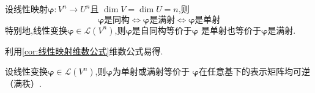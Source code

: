 \begin{green}
\begin{corollary}[同维的统一]\label{coro:同维的统一}
    设线性映射$\bm{\varphi}:V^n\longrightarrow U^n$且
    $\dim V=\dim U = n$,则
    \[
    \bm{\varphi}\text{是同构}\Longleftrightarrow
    \bm{\varphi}\text{是满射}\Longleftrightarrow
    \bm{\varphi}\text{是单射}
    \]
    特别地,线性变换$\bm{\varphi}\in \mathcal{L}\left(
        V^n
    \right)$,则$\bm{\varphi}$是自同构等价于$\bm{\varphi}$
    是单射也等价于$\bm{\varphi}$是满射.
\end{corollary}
\begin{Proof}
利用\cref{cor:线性映射维数公式}维数公式易得.
\end{Proof}
\end{green}
\begin{green}
\begin{corollary}[线性变换]\label{coro:线性变换}
    设线性变换$\bm{\varphi}\in \mathcal{L}\left(
        V^n
    \right)$,则$\bm{\varphi}$为单射或满射等价于
    $\bm{\varphi}$在任意基下的表示矩阵均可逆（满秩）.
\end{corollary}
\end{green}
